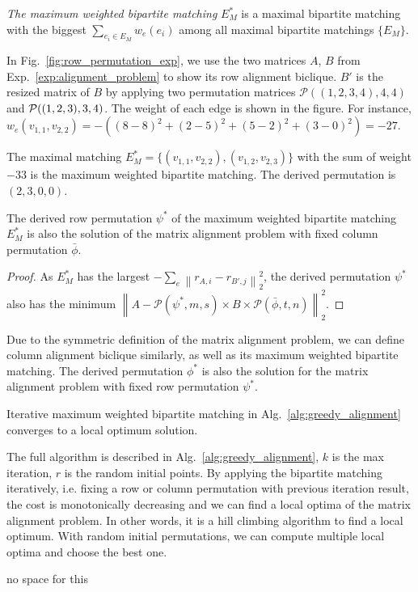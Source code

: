 \documentclass[conference]{IEEEtran}
\begin{document}
{\emph{The maximum weighted bipartite matching} $E^*_M$ is a maximal bipartite matching with the biggest $\sum_{e_i\in E_M} w_e(e_i)$ among all maximal bipartite matchings $\{E_M\}$. 


\begin{example} In Fig.~\ref{fig:row_permutation_exp}, we use the two matrices $A$, $B$ from Exp.~\ref{exp:alignment_problem} to show its row alignment biclique. $B'$ is the resized matrix of $B$ by applying two permutation matrices $\mathcal{P}((1,2,3,4), 4, 4)$ and $\mathcal{P}((1,2,3),\\ 3, 4)$. The weight of each edge is shown in the figure. For instance, $w_e(v_{1,1}, v_{2,2}) = - ((8-8)^2 + (2-5)^2 + (5-2)^2 + (3-0)^2) = -27$.


The maximal matching $E_M^* = \{(v_{1,1}, v_{2,2}), (v_{1,2}, v_{2,3})\}$ with the sum of weight $-33$ is the maximum weighted bipartite matching. The derived permutation is $(2,3,0,0)$.
\end{example}






\begin{lemma} The derived row permutation $\psi^*$ of the maximum weighted bipartite matching $E^*_M$ is also the solution of the matrix alignment problem with fixed column permutation $\bar \phi$.
\end{lemma}
\begin{proof}
As $E^*_M$ has the largest $- \sum_{e} \left\|r_{A,i} - r_{B',j}\right\|_2^2$, the derived permutation $\psi^*$ also has the minimum $\left\|A - \mathcal{P}(\psi^*,m,s)\times B \times \mathcal{P}(\bar \phi,t,n)\right\|_2^2$.
\end{proof}


Due to the symmetric definition of the matrix alignment problem, we can define column alignment biclique similarly, as well as its maximum weighted bipartite matching. The derived permutation $\phi^*$ is also the solution for the matrix alignment problem with fixed row permutation $\psi^*$. 


\begin{lemma} Iterative maximum weighted bipartite matching in Alg.~\ref{alg:greedy_alignment} converges to a local optimum solution.  
\end{lemma}


The full algorithm is described in Alg.~\ref{alg:greedy_alignment}, $k$ is the max iteration, $r$ is the random initial points. By applying the bipartite matching iteratively, i.e. fixing a row or column permutation with previous iteration result, the cost is monotonically decreasing and we can find a local optima of the matrix alignment problem. In other words, it is a hill climbing algorithm to find a local optimum. With random initial permutations, we can compute multiple local optima and choose the best one. 
}{no space for this}
\end{document}
